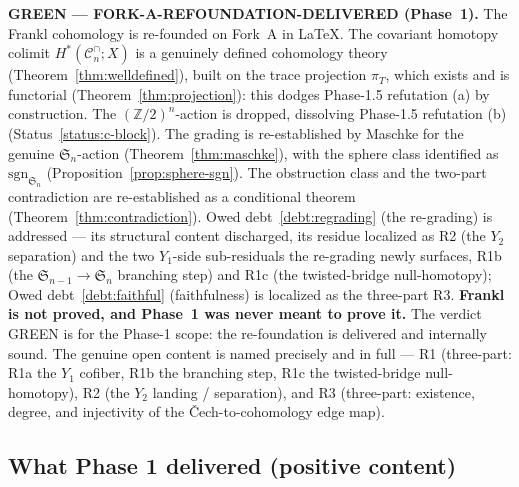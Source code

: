 \documentclass[11pt,oneside]{amsart}
\theoremstyle{plain}
\theoremstyle{definition}
\theoremstyle{remark}
\theoremstyle{honeststyle}
\newcommand{\sgn}{\mathrm{sgn}}
\newcommand{\Sym}{\mathfrak{S}}
\newcommand{\Z}{\mathbb{Z}}
\newcommand{\Cn}{\mathcal{C}^{\cap}_n}
\begin{document}
\textbf{GREEN --- FORK-A-REFOUNDATION-DELIVERED (Phase~1).} The Frankl
cohomology is re-founded on Fork~A in LaTeX. The covariant homotopy
colimit $H^{*}(\Cn;X)$ is a genuinely defined cohomology theory
(Theorem~\ref{thm:welldefined}), built on the trace projection
$\pi_T$, which exists and is functorial (Theorem~\ref{thm:projection}):
this dodges Phase-1.5 refutation (a) by construction. The
$(\Z/2)^n$-action is dropped, dissolving Phase-1.5 refutation (b)
(Status~\ref{status:c-block}). The grading is re-established by Maschke
for the genuine $\Sym_n$-action (Theorem~\ref{thm:maschke}), with the
sphere class identified as $\sgn_{\Sym_n}$
(Proposition~\ref{prop:sphere-sgn}). The obstruction class and the
two-part contradiction are re-established as a conditional theorem
(Theorem~\ref{thm:contradiction}). Owed debt~\ref{debt:regrading} (the
re-grading) is addressed --- its structural content discharged, its
residue localized as R2 (the $Y_2$ separation) and the two
$Y_1$-side sub-residuals the re-grading newly surfaces, R1b (the
$\Sym_{n-1}\to\Sym_n$ branching step) and R1c (the twisted-bridge
null-homotopy); Owed debt~\ref{debt:faithful} (faithfulness) is
localized as the three-part R3. \textbf{Frankl is not proved, and
Phase~1 was never meant to prove it.} The verdict GREEN is for the
Phase-1 scope: the re-foundation is delivered and internally sound.
The genuine open content is named precisely and in full --- R1
(three-part: R1a the $Y_1$ cofiber, R1b the branching step, R1c the
twisted-bridge null-homotopy), R2 (the $Y_2$ landing / separation),
and R3 (three-part: existence, degree, and injectivity of the
\v{C}ech-to-cohomology edge map).

\subsection{What Phase 1 delivered (positive content)}
\label{ssec:delivered}
\end{document}
